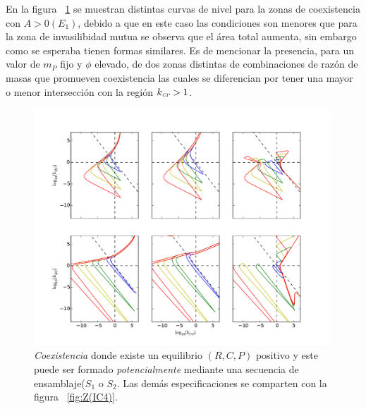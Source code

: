 En la figura  ~\ref{fig:PSCoexistence} se muestran distintas curvas de nivel para la zonas de coexistencia con $A>0(E_1)$, debido a que en este caso las condiciones son menores que para la zona de invasilibidad mutua se observa que el \'area total aumenta, sin embargo como se esperaba tienen formas similares. Es de mencionar la presencia, para un valor de $m_P$ fijo y $\phi$ elevado, de dos zonas distintas de combinaciones de raz\'on de masas que promueven coexistencia las cuales se diferencian por tener una mayor o menor intersecci\'on con la regi\'on $k_{\textit{\tiny CP}} > 1$. \\

\begin{figure}
  \centering
  \includegraphics[width = 0.99\textwidth]{./Plots/CoexistenceAcGrGr.pdf}
  \caption[Env $Coexistencia$]{\emph{Coexistencia} donde existe un equilibrio $(R,C,P)$ positivo y este puede ser formado \emph{potencialmente} mediante una secuencia de ensamblaje($S_1$ o $S_2$. Las dem\'as especificaciones se comparten con la figura ~\ref{fig:Z(IC4)}.}
  \label{fig:PSCoexistence}
\end{figure}

























